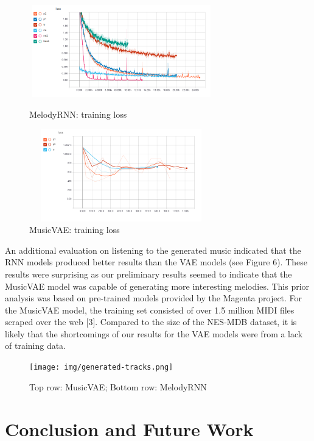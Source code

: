 \documentclass{article}
\begin{document}
\begin{figure}[htb!]
  \begin{minipage}{0.48\textwidth}
    \centering
    \includegraphics[height=4cm, width=8cm]{img/rnn_loss_all.png}
    \caption{MelodyRNN: training loss}
  \end{minipage}\hfill
  \begin{minipage}{0.48\textwidth}
    \centering
    \includegraphics[height=4cm, width=8cm]{img/vae_loss.png}
    \caption{MusicVAE: training loss}
  \end{minipage}
\end{figure}

An additional evaluation on listening to the generated music indicated that the RNN models produced better results than the VAE models (see Figure 6). These results were surprising as our preliminary results seemed to indicate that the MusicVAE model was capable of generating more interesting melodies. This prior analysis was based on pre-trained models provided by the Magenta project. For the MusicVAE model, the training set consisted of over 1.5 million MIDI files scraped over the web [3]. Compared to the size of the NES-MDB dataset, it is likely that the shortcomings of our results for the VAE models were from a lack of training data.


\begin{figure}[htb!]
  \begin{minipage}{1.0\textwidth}
    \centering
    \texttt{[image: img/generated-tracks.png]}
    \caption{Top row: MusicVAE; Bottom row: MelodyRNN}
  \end{minipage}
\end{figure}


\section{Conclusion and Future Work}
\end{document}
